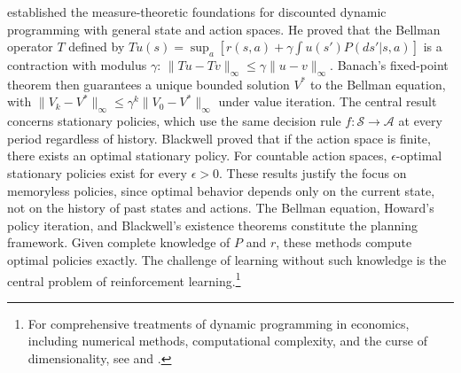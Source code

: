 \citet{blackwell1965} established the measure-theoretic foundations for discounted dynamic programming with general state and action spaces. He proved that the Bellman operator $T$ defined by $Tu(s) = \sup_a [r(s,a) + \gamma \int u(s') P(ds'|s,a)]$ is a contraction with modulus $\gamma$: $\|Tu - Tv\|_\infty \leq \gamma \|u - v\|_\infty$. Banach's fixed-point theorem then guarantees a unique bounded solution $V^*$ to the Bellman equation, with $\|V_k - V^*\|_\infty \leq \gamma^k \|V_0 - V^*\|_\infty$ under value iteration. The central result concerns stationary policies, which use the same decision rule $f: \mathcal{S} \to \mathcal{A}$ at every period regardless of history. Blackwell proved that if the action space is finite, there exists an optimal stationary policy. For countable action spaces, $\epsilon$-optimal stationary policies exist for every $\epsilon > 0$. These results justify the focus on memoryless policies, since optimal behavior depends only on the current state, not on the history of past states and actions. The Bellman equation, Howard's policy iteration, and Blackwell's existence theorems constitute the planning framework. Given complete knowledge of $P$ and $r$, these methods compute optimal policies exactly. The challenge of learning without such knowledge is the central problem of reinforcement learning.\footnote{For comprehensive treatments of dynamic programming in economics, including numerical methods, computational complexity, and the curse of dimensionality, see \citet{rust2008dp} and \citet{rust1996numerical}.}
